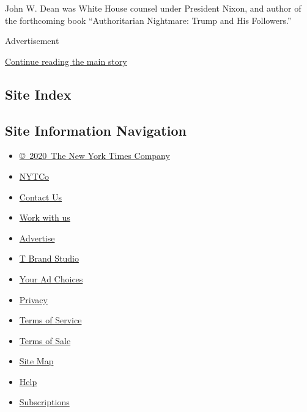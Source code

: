 John W. Dean was White House counsel under President Nixon, and author
of the forthcoming book ``Authoritarian Nightmare: Trump and His
Followers.''

Advertisement

\protect\hyperlink{after-bottom}{Continue reading the main story}

\hypertarget{site-index}{%
\subsection{Site Index}\label{site-index}}

\hypertarget{site-information-navigation}{%
\subsection{Site Information
Navigation}\label{site-information-navigation}}

\begin{itemize}
\tightlist
\item
  \href{https://help.nytimes3xbfgragh.onion/hc/en-us/articles/115014792127-Copyright-notice}{©~2020~The
  New York Times Company}
\end{itemize}

\begin{itemize}
\tightlist
\item
  \href{https://www.nytco.com/}{NYTCo}
\item
  \href{https://help.nytimes3xbfgragh.onion/hc/en-us/articles/115015385887-Contact-Us}{Contact
  Us}
\item
  \href{https://www.nytco.com/careers/}{Work with us}
\item
  \href{https://nytmediakit.com/}{Advertise}
\item
  \href{http://www.tbrandstudio.com/}{T Brand Studio}
\item
  \href{https://www.nytimes3xbfgragh.onion/privacy/cookie-policy\#how-do-i-manage-trackers}{Your
  Ad Choices}
\item
  \href{https://www.nytimes3xbfgragh.onion/privacy}{Privacy}
\item
  \href{https://help.nytimes3xbfgragh.onion/hc/en-us/articles/115014893428-Terms-of-service}{Terms
  of Service}
\item
  \href{https://help.nytimes3xbfgragh.onion/hc/en-us/articles/115014893968-Terms-of-sale}{Terms
  of Sale}
\item
  \href{https://spiderbites.nytimes3xbfgragh.onion}{Site Map}
\item
  \href{https://help.nytimes3xbfgragh.onion/hc/en-us}{Help}
\item
  \href{https://www.nytimes3xbfgragh.onion/subscription?campaignId=37WXW}{Subscriptions}
\end{itemize}
